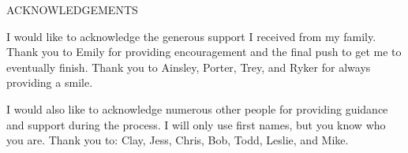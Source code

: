 \documentclass[SDSUThesis.tex]{subfiles}
\begin{document}
\newpage

\begin{center}
ACKNOWLEDGEMENTS\\
\end{center}

I would like to acknowledge the generous support I received from my family. Thank you
to Emily for providing encouragement and the final push to get me to eventually finish.
Thank you to Ainsley, Porter, Trey, and Ryker for always providing a smile.

I would also like to acknowledge numerous other people for providing
guidance and support during the process.
I will only use first names, but you know who you are. Thank you to: Clay, Jess, Chris,  
Bob, Todd, Leslie, and Mike.
\end{document}
